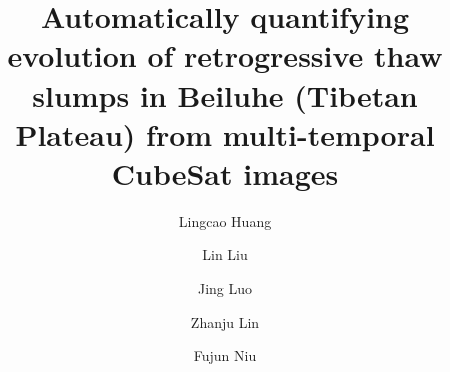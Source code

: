 \documentclass[authoryear,preprint,review,12pt]{elsarticle}
\begin{document}
\begin{frontmatter}




\title{Automatically quantifying evolution of retrogressive thaw slumps in Beiluhe (Tibetan Plateau) from multi-temporal CubeSat images}



\author[a,d]{Lingcao Huang}  
\author[a]{Lin Liu}
\author[b,c]{Jing Luo}
\author[b,c]{Zhanju Lin}
\author[b,c]{Fujun Niu}




\address[a]{Earth System Science Programme, Faculty of Science, The Chinese University of Hong Kong, Hong Kong SAR, China.}
\address[b]{Northwest Institute of Eco-Environment and Resources, Chinese Academy of Sciences, Lanzhou, China.}
\address[c]{State Key Laboratory of Frozen Soil Engineering, Northwest Institute of Eco-Environment and Resources, Chinese Academy of Sciences, Lanzhou, China}
\address[d]{Now at Earth Science and Observation Center, Cooperative Institute for Research in Environmental Sciences, University of Colorado Boulder, Boulder, USA.}



\end{frontmatter}
\end{document}
